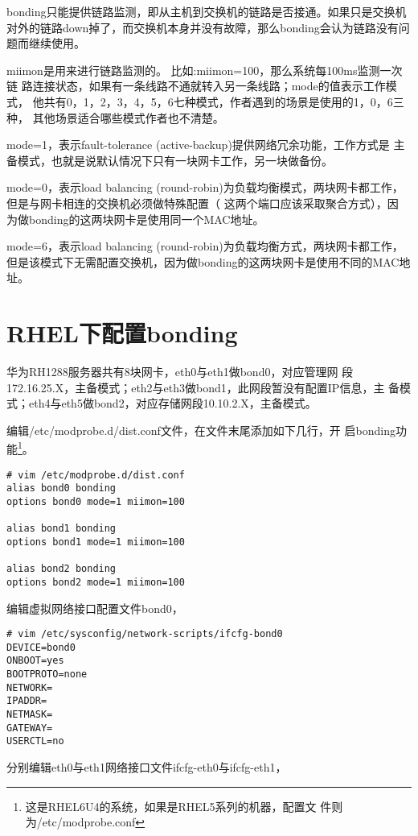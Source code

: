 bonding只能提供链路监测，即从主机到交换机的链路是否接通。如果只是交换机
对外的链路down掉了，而交换机本身并没有故障，那么bonding会认为链路没有问
题而继续使用。
 
miimon是用来进行链路监测的。 比如:miimon=100，那么系统每100ms监测一次链
路连接状态，如果有一条线路不通就转入另一条线路；mode的值表示工作模式，
他共有0，1，2，3，4，5，6七种模式，作者遇到的场景是使用的1，0，6三种，
其他场景适合哪些模式作者也不清楚。
 
mode=1，表示fault-tolerance (active-backup)提供网络冗余功能，工作方式是
主备模式，也就是说默认情况下只有一块网卡工作，另一块做备份。
 
mode=0，表示load balancing (round-robin)为负载均衡模式，两块网卡都工作，
但是与网卡相连的交换机必须做特殊配置（ 这两个端口应该采取聚合方式），因
为做bonding的这两块网卡是使用同一个MAC地址。
 
mode=6，表示load balancing (round-robin)为负载均衡方式，两块网卡都工作，
但是该模式下无需配置交换机，因为做bonding的这两块网卡是使用不同的MAC地
址。
 
\section{RHEL下配置bonding}

华为RH1288服务器共有8块网卡，eth0与eth1做bond0，对应管理网
段172.16.25.X，主备模式；eth2与eth3做bond1，此网段暂没有配置IP信息，主
备模式；eth4与eth5做bond2，对应存储网段10.10.2.X，主备模式。

编辑/etc/modprobe.d/dist.conf文件，在文件末尾添加如下几行，开
启bonding功能\footnote{这是RHEL6U4的系统，如果是RHEL5系列的机器，配置文
  件则为/etc/modprobe.conf}。

\begin{verbatim}
# vim /etc/modprobe.d/dist.conf
alias bond0 bonding
options bond0 mode=1 miimon=100

alias bond1 bonding
options bond1 mode=1 miimon=100

alias bond2 bonding
options bond2 mode=1 miimon=100
\end{verbatim}

编辑虚拟网络接口配置文件bond0，

\begin{verbatim}
# vim /etc/sysconfig/network-scripts/ifcfg-bond0
DEVICE=bond0
ONBOOT=yes
BOOTPROTO=none
NETWORK=
IPADDR=
NETMASK=
GATEWAY=
USERCTL=no
\end{verbatim}

分别编辑eth0与eth1网络接口文件ifcfg-eth0与ifcfg-eth1，

